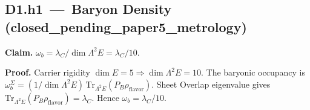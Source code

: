 \subsection*{D1.h1 \,---\, Baryon Density
\,(\textsf{closed\_pending\_paper5\_metrology})}
\textbf{Claim.} \(\omega_b=\lambda_C/\dim\Lambda^2 E=\lambda_C/10\).

\textbf{Proof.}
Carrier rigidity \(\dim E=5\Rightarrow\dim\Lambda^2 E=10\).  The
baryonic occupancy is
\(\omega_b^\Sigma=(1/\dim\Lambda^2 E)\,
\mathrm{Tr}_{\Lambda^2 E}(P_B\rho_{\mathrm{flavor}})\).
Sheet Overlap eigenvalue gives
\(\mathrm{Tr}_{\Lambda^2 E}(P_B\rho_{\mathrm{flavor}})=\lambda_C\).
Hence \(\omega_b=\lambda_C/10\).

